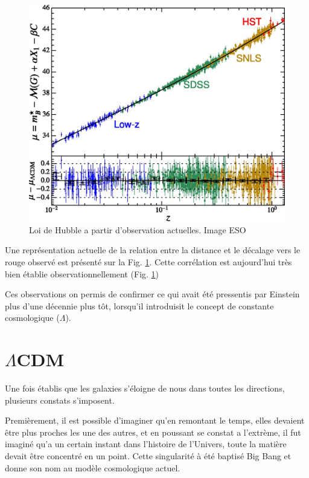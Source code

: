 \begin{figure}[bth]
        \includegraphics[width=.9\linewidth]{img/01/hubble_law.jpg} 
        \caption{Loi de Hubble a partir d'observation actuelles. 
        Image ESO}
 		\label{fig:hubble_law}
\end{figure}

Une représentation actuelle de la relation entre la distance et le décalage vers le rouge observé est présenté sur la Fig. \ref{fig:hubble_law}.
Cette corrélation est aujourd'hui très bien établie observationnellement (Fig. \ref{fig:hubble_law})

Ces observations on permis de confirmer ce qui avait été pressentis par Einstein plus d'une décennie plus tôt, lorsqu'il introduisit le concept de constante cosmologique ($\Lambda$). 



\section{$\Lambda$CDM}




Une fois établis que les galaxies s'éloigne de nous dans toutes les directions, plusieurs constats s'imposent.

Premièrement, il est possible d'imaginer qu'en remontant le temps, elles devaient être plus proches les une des autres, et en poussant se constat a l'extrème, il fut imaginé qu'a un certain instant dans l'histoire de l'Univers, toute la matière devait être concentré en un point.
Cette singularité à été baptisé Big Bang et donne son nom au modèle cosmologique actuel.


